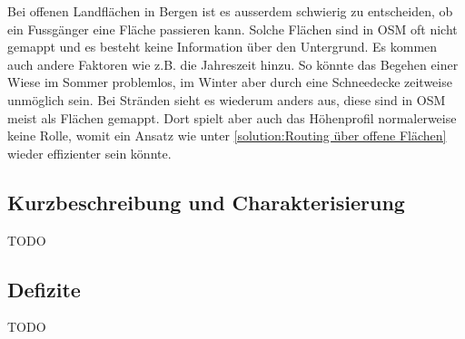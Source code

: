 Bei offenen Landflächen in Bergen ist es ausserdem schwierig zu entscheiden, ob ein Fussgänger eine Fläche passieren kann. Solche Flächen sind in \ac{OSM} oft nicht gemappt und es besteht keine Information über den Untergrund. Es kommen auch andere Faktoren wie z.B. die Jahreszeit hinzu. So könnte das Begehen einer Wiese im Sommer problemlos, im Winter aber durch eine Schneedecke zeitweise unmöglich sein. Bei Stränden sieht es wiederum anders aus, diese sind in \ac{OSM} meist als Flächen gemappt. Dort spielt aber auch das Höhenprofil normalerweise keine Rolle, womit ein Ansatz wie unter \ref{solution:Routing über offene Flächen} wieder effizienter sein könnte.

\subsection{Kurzbeschreibung und Charakterisierung}
\label{sub:Kurzbeschreibung und Charakterisierung}
TODO

\subsection{Defizite}
\label{sub:Defizite}
TODO
